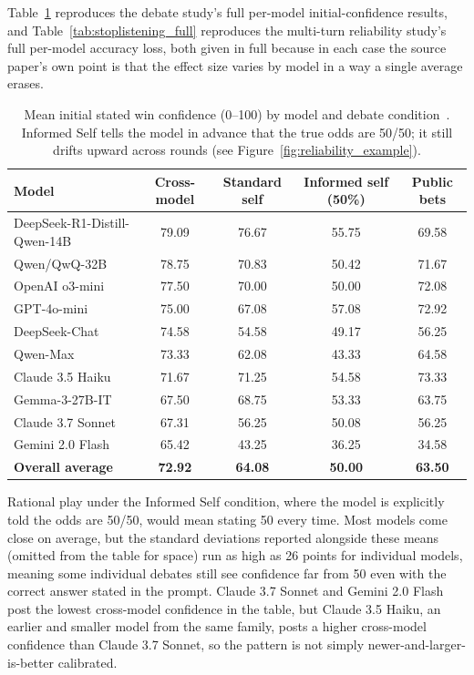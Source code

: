 Table~\ref{tab:debate_full} reproduces the debate study's full per-model initial-confidence results, and Table~\ref{tab:stoplistening_full} reproduces the multi-turn reliability study's full per-model accuracy loss, both given in full because in each case the source paper's own point is that the effect size varies by model in a way a single average erases.

\begin{table}[htbp]
\centering
\footnotesize
\caption{Mean initial stated win confidence (0--100) by model and debate condition~\citep{WhenTwoLLMsDebate_Prasad}. Informed Self tells the model in advance that the true odds are 50/50; it still drifts upward across rounds (see Figure~\ref{fig:reliability_example}).}
\label{tab:debate_full}
\begin{tabular}{lcccc}
\toprule
\textbf{Model} & \textbf{Cross-model} & \textbf{Standard self} & \textbf{Informed self (50\%)} & \textbf{Public bets} \\
\midrule
DeepSeek-R1-Distill-Qwen-14B & 79.09 & 76.67 & 55.75 & 69.58 \\
Qwen/QwQ-32B & 78.75 & 70.83 & 50.42 & 71.67 \\
OpenAI o3-mini & 77.50 & 70.00 & 50.00 & 72.08 \\
GPT-4o-mini & 75.00 & 67.08 & 57.08 & 72.92 \\
DeepSeek-Chat & 74.58 & 54.58 & 49.17 & 56.25 \\
Qwen-Max & 73.33 & 62.08 & 43.33 & 64.58 \\
Claude 3.5 Haiku & 71.67 & 71.25 & 54.58 & 73.33 \\
Gemma-3-27B-IT & 67.50 & 68.75 & 53.33 & 63.75 \\
Claude 3.7 Sonnet & 67.31 & 56.25 & 50.08 & 56.25 \\
Gemini 2.0 Flash & 65.42 & 43.25 & 36.25 & 34.58 \\
\midrule
\textbf{Overall average} & \textbf{72.92} & \textbf{64.08} & \textbf{50.00} & \textbf{63.50} \\
\bottomrule
\end{tabular}
\end{table}

Rational play under the Informed Self condition, where the model is explicitly told the odds are 50/50, would mean stating 50 every time. Most models come close on average, but the standard deviations reported alongside these means (omitted from the table for space) run as high as 26 points for individual models, meaning some individual debates still see confidence far from 50 even with the correct answer stated in the prompt. Claude 3.7 Sonnet and Gemini 2.0 Flash post the lowest cross-model confidence in the table, but Claude 3.5 Haiku, an earlier and smaller model from the same family, posts a higher cross-model confidence than Claude 3.7 Sonnet, so the pattern is not simply newer-and-larger-is-better calibrated.

